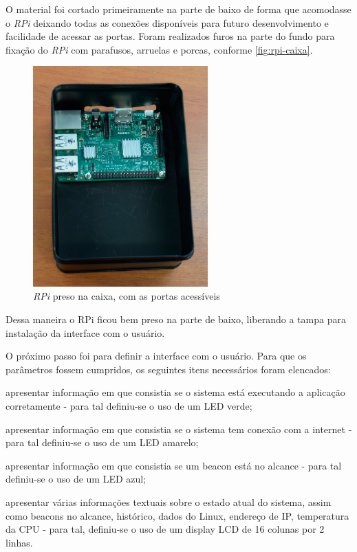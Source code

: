 \documentclass[
		12pt,				%
		openright,			%
		oneside,			%
		a4paper,			%
		chapter=TITLE,		%
		english,			%
		brazil				%
	]{abntex2}
\begin{document}
O material foi cortado primeiramente na parte de baixo de forma que acomodasse o \textit{RPi} deixando todas as conexões disponíveis para futuro desenvolvimento e facilidade de acessar as portas. Foram realizados furos na parte do fundo para fixação do \textit{RPi} com parafusos, arruelas e porcas, conforme \autoref{fig:rpi-caixa}.


\begin{figure}[htb]
	\caption{\label{fig:rpi-caixa}\textit{RPi} preso na caixa, com as portas acessíveis}
	\begin{center}
		\includegraphics[width=0.6\textwidth]{img/rpi-caixa.jpg}
	\end{center}
\end{figure}

Dessa maneira o RPi ficou bem preso na parte de baixo, liberando a tampa para instalação da interface com o usuário.

O próximo passo foi para definir a interface com o usuário. Para que os parâmetros fossem cumpridos, os seguintes itens necessários foram elencados:

\begin{alineas}
	\item apresentar informação em que consistia se o sistema está executando a aplicação corretamente - para tal definiu-se o uso de um LED verde;
	\item apresentar informação em que consistia se o sistema tem conexão com a internet - para tal definiu-se o uso de um LED amarelo;
	\item apresentar informação em que consistia se um beacon está no alcance - para tal definiu-se o uso de um LED azul;
	\item apresentar várias informações textuais sobre o estado atual do sistema, assim como beacons no alcance, histórico, dados do Linux, endereço de IP, temperatura da CPU - para tal, definiu-se o uso de um display LCD de 16 colunas por 2 linhas.
\end{alineas}
\end{document}
